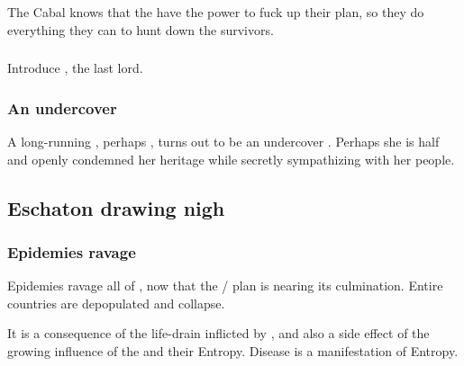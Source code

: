 The Cabal knows that the \Kezeradi{} have the power to fuck up their plan, so they do everything they can to hunt down the survivors.





\subsubsection[Sithiyacan]{\Sithiyacaan}
Introduce , the last  lord. 





\subsubsection{An undercover \Kezeradi}
A long-running \resphan, perhaps \Achsah, turns out to be an undercover \Kezeradi. Perhaps she is half \Kezeradi{} and openly condemned her heritage while secretly sympathizing with her people.









\subsection{Eschaton drawing nigh}





\subsubsection{Epidemies ravage \Azmith}
Epidemies ravage all of \Azmith, now that the \Iquin/ plan is nearing its culmination. 
Entire countries are depopulated and collapse. 

It is a consequence of the life-drain inflicted by \Iquin, and also a side effect of the growing influence of the \banelords and their Entropy.
Disease is a manifestation of Entropy.

